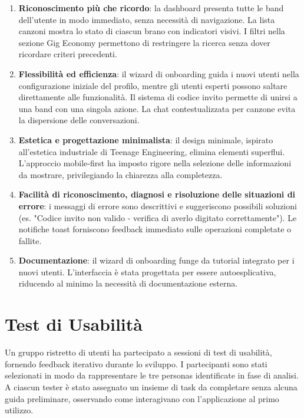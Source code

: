 \documentclass{report}
\begin{document}
\begin{enumerate}
    \item \textbf{Riconoscimento più che ricordo}: la dashboard presenta tutte le band dell'utente in modo immediato, senza necessità di navigazione. La lista canzoni mostra lo stato di ciascun brano con indicatori visivi. I filtri nella sezione Gig Economy permettono di restringere la ricerca senza dover ricordare criteri precedenti.

    \item \textbf{Flessibilità ed efficienza}: il wizard di onboarding guida i nuovi utenti nella configurazione iniziale del profilo, mentre gli utenti esperti possono saltare direttamente alle funzionalità. Il sistema di codice invito permette di unirsi a una band con una singola azione. La chat contestualizzata per canzone evita la dispersione delle conversazioni.

    \item \textbf{Estetica e progettazione minimalista}: il design minimale, ispirato all'estetica industriale di Teenage Engineering, elimina elementi superflui. L'approccio mobile-first ha imposto rigore nella selezione delle informazioni da mostrare, privilegiando la chiarezza alla completezza.

    \item \textbf{Facilità di riconoscimento, diagnosi e risoluzione delle situazioni di errore}: i messaggi di errore sono descrittivi e suggeriscono possibili soluzioni (es. "Codice invito non valido - verifica di averlo digitato correttamente"). Le notifiche toast forniscono feedback immediato sulle operazioni completate o fallite.

    \item \textbf{Documentazione}: il wizard di onboarding funge da tutorial integrato per i nuovi utenti. L'interfaccia è stata progettata per essere autoesplicativa, riducendo al minimo la necessità di documentazione esterna.
\end{enumerate}

\section{Test di Usabilità}

Un gruppo ristretto di utenti ha partecipato a sessioni di test di usabilità, fornendo feedback iterativo durante lo sviluppo. I partecipanti sono stati selezionati in modo da rappresentare le tre personas identificate in fase di analisi. A ciascun tester è stato assegnato un insieme di task da completare senza alcuna guida preliminare, osservando come interagivano con l'applicazione al primo utilizzo.
\end{document}

